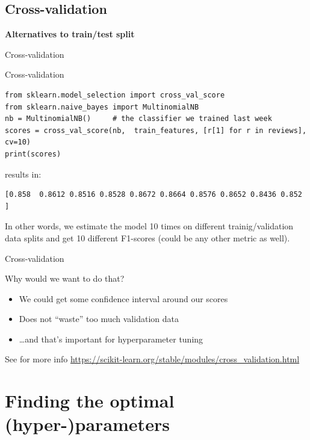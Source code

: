 \documentclass{beamer}
\begin{document}
\subsection{Cross-validation}

\begin{frame}[plain]
\textbf{Alternatives to train/test split}

Cross-validation
\end{frame}

\begin{frame}[fragile]{Cross-validation}
\begin{lstlisting}
from sklearn.model_selection import cross_val_score
from sklearn.naive_bayes import MultinomialNB
nb = MultinomialNB()     # the classifier we trained last week
scores = cross_val_score(nb,  train_features, [r[1] for r in reviews], cv=10)
print(scores)
\end{lstlisting}

results in:

\begin{lstlisting}
[0.858  0.8612 0.8516 0.8528 0.8672 0.8664 0.8576 0.8652 0.8436 0.852 ]
\end{lstlisting}

In other words, we estimate the model 10 times on different trainig/validation data splits and get 10 different F1-scores (could be any other metric as well).

\end{frame}


\begin{frame}{Cross-validation}
\begin{block}{Why would we want to do that?}
\begin{itemize}
\item We could get some confidence interval around our scores
\item Does not ``waste'' too much validation data
\item \ldots and that's important for hyperparameter tuning
\end{itemize}

\end{block}

{\footnotesize See for more info
\url{https://scikit-learn.org/stable/modules/cross\_validation.html}}
\end{frame}





\section{Finding the optimal (hyper-)parameters}
\end{document}
